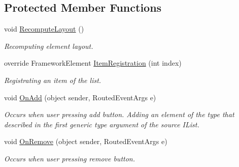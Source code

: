 \subsection*{Protected Member Functions}
\begin{DoxyCompactItemize}
\item 
void \mbox{\hyperlink{class_wpf_handler_1_1_u_i_1_1_controls_1_1_auto_collection_a01ab069c42e1737cebb4bb813ec8aa06}{Recompute\+Layout}} ()
\begin{DoxyCompactList}\small\item\em Recomputing element layout. \end{DoxyCompactList}\item 
override Framework\+Element \mbox{\hyperlink{class_wpf_handler_1_1_u_i_1_1_controls_1_1_auto_collection_a7cea6362ca2a31dca7bca6ab1f39142d}{Item\+Registration}} (int index)
\begin{DoxyCompactList}\small\item\em Registrating an item of the list. \end{DoxyCompactList}\item 
void \mbox{\hyperlink{class_wpf_handler_1_1_u_i_1_1_controls_1_1_auto_collection_aa1fe0a4a51d4d2bc90bc7413f157513f}{On\+Add}} (object sender, Routed\+Event\+Args e)
\begin{DoxyCompactList}\small\item\em Occurs when user pressing add button. Adding an element of the type that described in the first generic type argument of the source I\+List. \end{DoxyCompactList}\item 
void \mbox{\hyperlink{class_wpf_handler_1_1_u_i_1_1_controls_1_1_auto_collection_a782eacc20f715ac1d15e3ca15b96b870}{On\+Remove}} (object sender, Routed\+Event\+Args e)
\begin{DoxyCompactList}\small\item\em Occurs when user pressing remove button. \end{DoxyCompactList}\end{DoxyCompactItemize}
